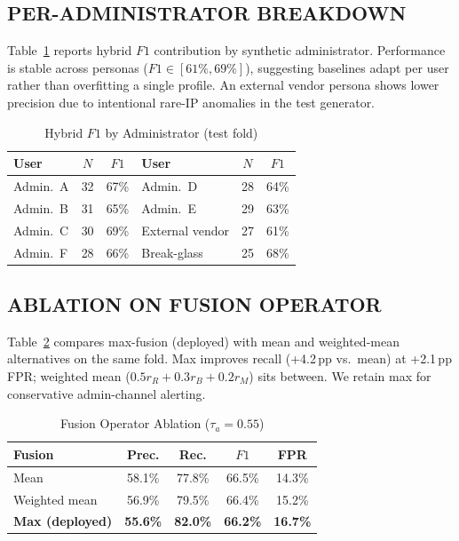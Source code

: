 \documentclass{ieeeaccess}
\begin{document}
\subsection{PER-ADMINISTRATOR BREAKDOWN}
Table~\ref{tab:per-user} reports hybrid $F1$ contribution by synthetic administrator. Performance is stable across personas ($F1\in[61\%,69\%]$), suggesting baselines adapt per user rather than overfitting a single profile. An external vendor persona shows lower precision due to intentional rare-IP anomalies in the test generator.

\begin{table}[!t]
\caption{Hybrid $F1$ by Administrator (test fold)}
\label{tab:per-user}
\centering
\scriptsize
\begin{tabular}{@{}lcc|lcc@{}}
\toprule
\textbf{User} & $N$ & $F1$ & \textbf{User} & $N$ & $F1$ \\
\midrule
Admin.~A & 32 & 67\% & Admin.~D & 28 & 64\% \\
Admin.~B & 31 & 65\% & Admin.~E & 29 & 63\% \\
Admin.~C & 30 & 69\% & External vendor & 27 & 61\% \\
Admin.~F & 28 & 66\% & Break-glass & 25 & 68\% \\
\bottomrule
\end{tabular}
\end{table}

\subsection{ABLATION ON FUSION OPERATOR}
Table~\ref{tab:fusion-ablation} compares max-fusion (deployed) with mean and weighted-mean alternatives on the same fold. Max improves recall (+4.2\,pp vs.\ mean) at +2.1\,pp FPR; weighted mean ($0.5r_R+0.3r_B+0.2r_M$) sits between. We retain max for conservative admin-channel alerting.

\begin{table}[!t]
\caption{Fusion Operator Ablation ($\tau_a=0.55$)}
\label{tab:fusion-ablation}
\centering
\scriptsize
\begin{tabular}{@{}lcccc@{}}
\toprule
\textbf{Fusion} & Prec. & Rec. & $F1$ & FPR \\
\midrule
Mean & 58.1\% & 77.8\% & 66.5\% & 14.3\% \\
Weighted mean & 56.9\% & 79.5\% & 66.4\% & 15.2\% \\
\textbf{Max (deployed)} & \textbf{55.6\%} & \textbf{82.0\%} & \textbf{66.2\%} & \textbf{16.7\%} \\
\bottomrule
\end{tabular}
\end{table}
\end{document}
